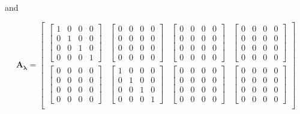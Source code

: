 \documentclass[twocolumn,10pt]{asme2ej}
\begin{document}
and

\begin{equation}
    \bm{A_{\lambda}} = \begin{bmatrix}
    \begin{bmatrix} 1 & 0 & 0 & 0 \\ 0 & 1 & 0 & 0 \\ 0 & 0 & 1 & 0 \\ 0 & 0 & 0 & 1 \end{bmatrix} &
    \begin{bmatrix} 0 & 0 & 0 & 0 \\ 0 & 0 & 0 & 0 \\ 0 & 0 & 0 & 0 \\ 0 & 0 & 0 & 0 \end{bmatrix} &
    \begin{bmatrix} 0 & 0 & 0 & 0 \\ 0 & 0 & 0 & 0 \\ 0 & 0 & 0 & 0 \\ 0 & 0 & 0 & 0 \end{bmatrix} &
    \begin{bmatrix} 0 & 0 & 0 & 0 \\ 0 & 0 & 0 & 0 \\ 0 & 0 & 0 & 0 \\ 0 & 0 & 0 & 0 \end{bmatrix} \\
      \begin{bmatrix} 0 & 0 & 0 & 0 \\ 0 & 0 & 0 & 0 \\ 0 & 0 & 0 & 0 \\ 0 & 0 & 0 & 0 \end{bmatrix} &
      \begin{bmatrix} 1 & 0 & 0 & 0 \\ 0 & 1 & 0 & 0 \\ 0 & 0 & 1 & 0 \\ 0 & 0 & 0 & 1 \end{bmatrix} &
      \begin{bmatrix} 0 & 0 & 0 & 0 \\ 0 & 0 & 0 & 0 \\ 0 & 0 & 0 & 0 \\ 0 & 0 & 0 & 0 \end{bmatrix} &
      \begin{bmatrix} 0 & 0 & 0 & 0 \\ 0 & 0 & 0 & 0 \\ 0 & 0 & 0 & 0 \\ 0 & 0 & 0 & 0 \end{bmatrix} \\

\end{bmatrix}
\end{equation}
\end{document}
